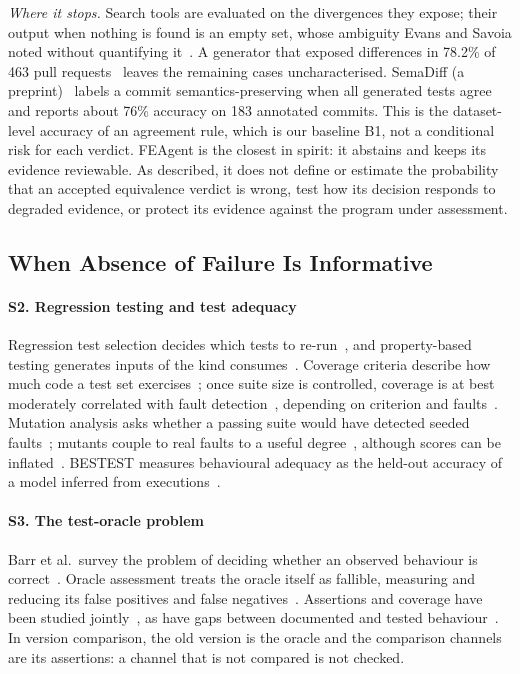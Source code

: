 \emph{Where it stops.} Search tools are evaluated on the divergences they expose; their output when nothing is found is an empty set, whose ambiguity Evans and Savoia noted without quantifying it~\cite{evans2007differential}. A generator that exposed differences in 78.2\% of 463 pull requests~\cite{hu2026difftestgen} leaves the remaining cases uncharacterised. SemaDiff (a preprint)~\cite{ayub2026semadiff} labels a commit semantics-preserving when all generated tests agree and reports about 76\% accuracy on 183 annotated commits. This is the dataset-level accuracy of an agreement rule, which is our baseline B1, not a conditional risk for each verdict. FEAgent is the closest in spirit: it abstains and keeps its evidence reviewable. As described, it does not define or estimate the probability that an accepted equivalence verdict is wrong, test how its decision responds to degraded evidence, or protect its evidence against the program under assessment.

\subsection{When Absence of Failure Is Informative}
\paragraph*{S2. Regression testing and test adequacy} Regression test selection decides which tests to re-run~\cite{rothermel1996analyzing,yoo2012regression}, and property-based testing generates inputs of the kind \sbg{} consumes~\cite{claessen2000quickcheck,maciver2019hypothesis}. Coverage criteria describe how much code a test set exercises~\cite{zhu1997software}; once suite size is controlled, coverage is at best moderately correlated with fault detection~\cite{inozemtseva2014coverage,gopinath2014code,kochhar2015code}, depending on criterion and faults~\cite{chekam2017empirical}. Mutation analysis asks whether a passing suite would have detected seeded faults~\cite{jia2011analysis,papadakis2019mutation}; mutants couple to real faults to a useful degree~\cite{just2014mutants}, although scores can be inflated~\cite{papadakis2018mutation}. BESTEST measures behavioural adequacy as the held-out accuracy of a model inferred from executions~\cite{fraser2012behaviourally,fraser2015assessing}.

\paragraph*{S3. The test-oracle problem} Barr et al.\ survey the problem of deciding whether an observed behaviour is correct~\cite{barr2015oracle}. Oracle assessment treats the oracle itself as fallible, measuring and reducing its false positives and false negatives~\cite{jahangirova2016oracle}. Assertions and coverage have been studied jointly~\cite{zhang2015assertions}, as have gaps between documented and tested behaviour~\cite{paul2026beyond}. In version comparison, the old version is the oracle and the comparison channels are its assertions: a channel that is not compared is not checked.

